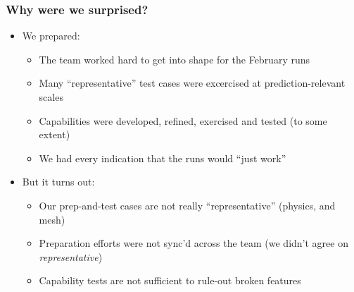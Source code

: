 \begin{frame}\frametitle{Why were we surprised?}
\begin{multicols}{2}
\begin{itemize}
\item We prepared:
\begin{itemize}
\item The team worked hard to get \mirgecom{} into shape for the February runs
\item Many ``representative'' test cases were excercised at prediction-relevant scales
\item Capabilities were developed, refined, exercised and tested (to some extent)
\item We had every indication that the runs would ``just work''
\end{itemize}
\end{itemize}
\columnbreak
\begin{itemize}
\item But it turns out:
\begin{itemize}
\item Our prep-and-test cases are not really ``representative'' (physics, and mesh)
\item Preparation efforts were not sync'd across the team (we didn't agree on \textit{representative})
\item Capability tests are not sufficient to rule-out broken features
\end{itemize}
\end{itemize}
\end{multicols}
\end{frame}

